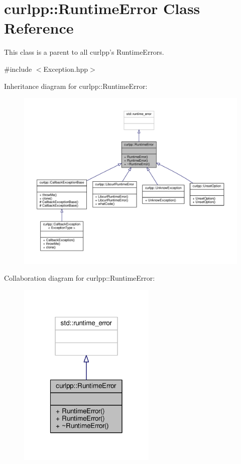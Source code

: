 \hypertarget{classcurlpp_1_1RuntimeError}{\section{curlpp\-:\-:Runtime\-Error Class Reference}
\label{classcurlpp_1_1RuntimeError}
}


This class is a parent to all curlpp's Runtime\-Errors.  




{\ttfamily \#include $<$Exception.\-hpp$>$}



Inheritance diagram for curlpp\-:\-:Runtime\-Error\-:
\nopagebreak
\begin{figure}[H]
\begin{center}
\leavevmode
\includegraphics[width=350pt]{classcurlpp_1_1RuntimeError__inherit__graph}
\end{center}
\end{figure}


Collaboration diagram for curlpp\-:\-:Runtime\-Error\-:
\nopagebreak
\begin{figure}[H]
\begin{center}
\leavevmode
\includegraphics[width=186pt]{classcurlpp_1_1RuntimeError__coll__graph}
\end{center}
\end{figure}
